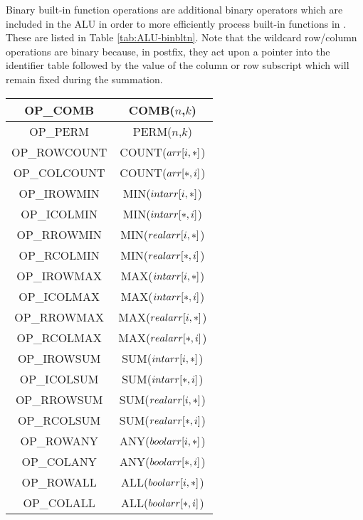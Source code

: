 Binary built-in function operations are additional binary operators which
are included in the ALU in order to more efficiently process built-in
functions in .   These are
listed in Table \ref{tab:ALU-binbltn}.   Note that the wildcard row/column
operations are binary because, in postfix, they act upon a pointer into
the identifier table followed by the value of the column or row subscript
which will remain fixed during the summation.

\starttab
\begin{tabular}{|c|c|}
\hline OP\_COMB       & COMB($n$,$k$) \\
\hline OP\_PERM       & PERM($n$,$k$) \\
\hline OP\_ROWCOUNT   & COUNT($arr \char91 i , * \char93$) \\
\hline OP\_COLCOUNT   & COUNT($arr \char91 * , i \char93$) \\
\hline OP\_IROWMIN    & MIN($intarr \char91 i , * \char93$) \\
\hline OP\_ICOLMIN    & MIN($intarr \char91 * , i \char93$) \\
\hline OP\_RROWMIN    & MIN($realarr \char91 i , * \char93$) \\
\hline OP\_RCOLMIN    & MIN($realarr \char91 * , i \char93$) \\
\hline OP\_IROWMAX    & MAX($intarr \char91 i , * \char93$) \\
\hline OP\_ICOLMAX    & MAX($intarr \char91 * , i \char93$) \\
\hline OP\_RROWMAX    & MAX($realarr \char91 i , * \char93$) \\
\hline OP\_RCOLMAX    & MAX($realarr \char91 * , i \char93$) \\
\hline OP\_IROWSUM    & SUM($intarr \char91 i , * \char93$) \\
\hline OP\_ICOLSUM    & SUM($intarr \char91 * , i \char93$) \\
\hline OP\_RROWSUM    & SUM($realarr \char91 i , * \char93$) \\
\hline OP\_RCOLSUM    & SUM($realarr \char91 * , i \char93$) \\
\hline OP\_ROWANY     & ANY($boolarr \char91 i , * \char93$) \\
\hline OP\_COLANY     & ANY($boolarr \char91 * , i \char93$) \\
\hline OP\_ROWALL     & ALL($boolarr \char91 i , * \char93$) \\
\hline OP\_COLALL     & ALL($boolarr \char91 * , i \char93$) \\
\hline
\end{tabular}

